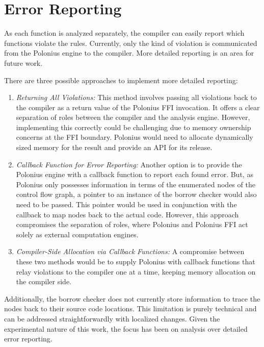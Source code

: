 \documentclass[
  11pt,
  twoside]{report}
\begin{document}
\section{Error Reporting}\label{sec:error-reporting}

As each function is analyzed separately, the compiler can easily report
which functions violate the rules. Currently, only the kind of violation
is communicated from the Polonius engine to the compiler. More detailed
reporting is an area for future work.

There are three possible approaches to implement more detailed
reporting:

\begin{enumerate}
\def\labelenumi{\arabic{enumi}.}
\item
  \emph{Returning All Violations:} This method involves passing all
  violations back to the compiler as a return value of the Polonius FFI
  invocation. It offers a clear separation of roles between the compiler
  and the analysis engine. However, implementing this correctly could be
  challenging due to memory ownership concerns at the FFI boundary.
  Polonius would need to allocate dynamically sized memory for the
  result and provide an API for its release.
\item
  \emph{Callback Function for Error Reporting:} Another option is to
  provide the Polonius engine with a callback function to report each
  found error. But, as Polonius only possesses information in terms of
  the enumerated nodes of the control flow graph, a pointer to an
  instance of the borrow checker would also need to be passed. This
  pointer would be used in conjunction with the callback to map nodes
  back to the actual code. However, this approach compromises the
  separation of roles, where Polonius and Polonius FFI act solely as
  external computation engines.
\item
  \emph{Compiler-Side Allocation via Callback Functions:} A compromise
  between these two methods would be to supply Polonius with callback
  functions that relay violations to the compiler one at a time, keeping
  memory allocation on the compiler side.
\end{enumerate}

Additionally, the borrow checker does not currently store information to
trace the nodes back to their source code locations. This limitation is
purely technical and can be addressed straightforwardly with localized
changes. Given the experimental nature of this work, the focus has been
on analysis over detailed error reporting.
\end{document}
